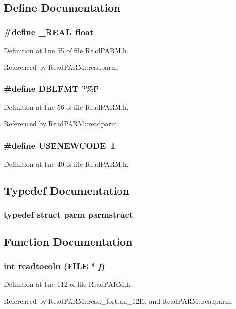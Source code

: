 \subsection{Define Documentation}
\subsubsection{\setlength{\rightskip}{0pt plus 5cm}\#define \_\-REAL\ float}\label{ReadPARM_8h_a1}




Definition at line 55 of file Read\-PARM.h.

Referenced by Read\-PARM::readparm.
\subsubsection{\setlength{\rightskip}{0pt plus 5cm}\#define DBLFMT\ \char`\"{}\%f\char`\"{}}\label{ReadPARM_8h_a2}




Definition at line 56 of file Read\-PARM.h.

Referenced by Read\-PARM::readparm.
\subsubsection{\setlength{\rightskip}{0pt plus 5cm}\#define USENEWCODE\ 1}\label{ReadPARM_8h_a0}




Definition at line 40 of file Read\-PARM.h.

\subsection{Typedef Documentation}
\subsubsection{\setlength{\rightskip}{0pt plus 5cm}typedef struct {\bf parm}  parmstruct}\label{ReadPARM_8h_a3}




\subsection{Function Documentation}
\subsubsection{\setlength{\rightskip}{0pt plus 5cm}int readtoeoln (FILE $\ast$ {\em f})\hspace{0.3cm}{\tt  [static]}}\label{ReadPARM_8h_a4}




Definition at line 112 of file Read\-PARM.h.

Referenced by Read\-PARM::read\_\-fortran\_\-12I6, and Read\-PARM::readparm.